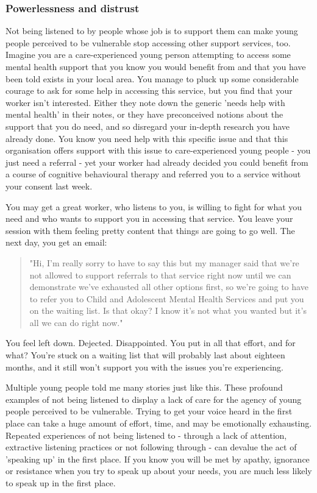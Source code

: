 \subsubsection{Powerlessness and distrust}
Not being listened to by people whose job is to support them can make young people perceived to be vulnerable stop accessing other support services, too. Imagine you are a care-experienced young person attempting to access some mental health support that you know you would benefit from and that you have been told exists in your local area. You manage to pluck up some considerable courage to ask for some help in accessing this service, but you find that your worker isn't interested. Either they note down the generic 'needs help with mental health' in their notes, or they have preconceived notions about the support that you do need, and so disregard your in-depth research you have already done. You know you need help with this specific issue and that this organisation offers support with this issue to care-experienced young people - you just need a referral - yet your worker had already decided you could benefit from a course of cognitive behavioural therapy and referred you to a service without your consent last week.

You may get a great worker, who listens to you, is willing to fight for what you need and who wants to support you in accessing that service. You leave your session with them feeling pretty content that things are going to go well. The next day, you get an email:
\begin{quote}
"Hi, I'm really sorry to have to say this but my manager said that we’re not allowed to support referrals to that service right now until we can demonstrate we’ve exhausted all other options first, so we’re going to have to refer you to Child and Adolescent Mental Health Services and put you on the waiting list. Is that okay? I know it's not what you wanted but it's all we can do right now."
\end{quote}
You feel left down. Dejected. Disappointed. You put in all that effort, and for what? You’re stuck on a waiting list that will probably last about eighteen months, and it still won’t support you with the issues you’re experiencing. 

Multiple young people told me many stories just like this. These profound examples of not being listened to display a lack of care for the agency of young people perceived to be vulnerable. Trying to get your voice heard in the first place can take a huge amount of effort, time, and may be emotionally exhausting. Repeated experiences of not being listened to - through a lack of attention, extractive listening practices or not following through - can devalue the act of 'speaking up' in the first place. If you know you will be met by apathy, ignorance or resistance when you try to speak up about your needs, you are much less likely to speak up in the first place.

